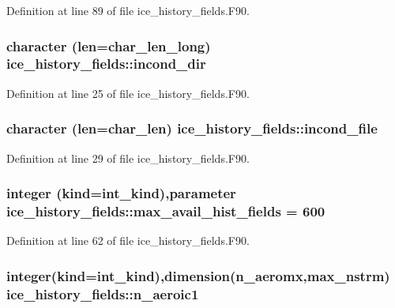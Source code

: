Definition at line 89 of file ice\_\-history\_\-fields.F90.\hypertarget{namespaceice__history__fields_a657cfadfafd4d1cc6407ddcd83a7c868}{
\subsubsection[{incond\_\-dir}]{\setlength{\rightskip}{0pt plus 5cm}character (len=char\_\-len\_\-long) {\bf ice\_\-history\_\-fields::incond\_\-dir}}}
\label{namespaceice__history__fields_a657cfadfafd4d1cc6407ddcd83a7c868}


Definition at line 25 of file ice\_\-history\_\-fields.F90.\hypertarget{namespaceice__history__fields_aafbbbc135005a06804884fb2cca8d494}{
\subsubsection[{incond\_\-file}]{\setlength{\rightskip}{0pt plus 5cm}character (len=char\_\-len) {\bf ice\_\-history\_\-fields::incond\_\-file}}}
\label{namespaceice__history__fields_aafbbbc135005a06804884fb2cca8d494}


Definition at line 29 of file ice\_\-history\_\-fields.F90.\hypertarget{namespaceice__history__fields_abce9e6fec5b792ea13bd34332a858f16}{
\subsubsection[{max\_\-avail\_\-hist\_\-fields}]{\setlength{\rightskip}{0pt plus 5cm}integer (kind=int\_\-kind),parameter {\bf ice\_\-history\_\-fields::max\_\-avail\_\-hist\_\-fields} = 600}}
\label{namespaceice__history__fields_abce9e6fec5b792ea13bd34332a858f16}


Definition at line 62 of file ice\_\-history\_\-fields.F90.\hypertarget{namespaceice__history__fields_ad6f36fcab3ebeaa42f44b63a39474c4a}{
\subsubsection[{n\_\-aeroic1}]{\setlength{\rightskip}{0pt plus 5cm}integer(kind=int\_\-kind),dimension(n\_\-aeromx,max\_\-nstrm) {\bf ice\_\-history\_\-fields::n\_\-aeroic1}}}
\label{namespaceice__history__fields_ad6f36fcab3ebeaa42f44b63a39474c4a}


